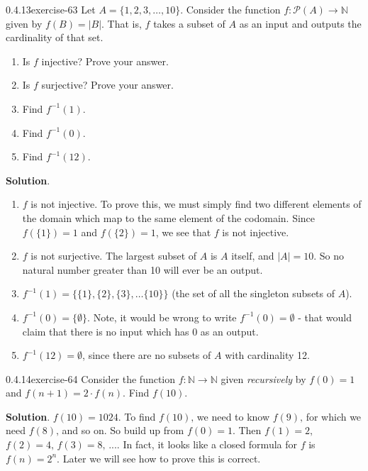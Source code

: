 \documentclass[twoside,11pt,]{book}
\numberwithin{equation}{chapter}
\newcommand{\N}{\mathbb N}
\newcommand{\pow}{\mathcal P}
\newcommand{\inv}{^{-1}}
\begin{document}
\begin{divisionsolution}{0.4.13}{}{exercise-63}%
\hypertarget{p-1070}{}%
Let \(A = \{1,2,3,\ldots,10\}\). Consider the function \(f:\pow(A) \to \N\) given by \(f(B) = |B|\). That is, \(f\) takes a subset of \(A\) as an input and outputs the cardinality of that set.\leavevmode%
\begin{enumerate}[label=(\alph*)]
\item\hypertarget{li-867}{}\hypertarget{p-1071}{}%
Is \(f\) injective? Prove your answer.%
\item\hypertarget{li-868}{}\hypertarget{p-1072}{}%
Is \(f\) surjective? Prove your answer.%
\item\hypertarget{li-869}{}\hypertarget{p-1073}{}%
Find \(f\inv(1)\).%
\item\hypertarget{li-870}{}\hypertarget{p-1074}{}%
Find \(f\inv(0)\).%
\item\hypertarget{li-871}{}\hypertarget{p-1075}{}%
Find \(f\inv(12)\).%
\end{enumerate}
%
\par\smallskip%
\noindent\textbf{Solution}.\quad%
\hypertarget{p-1076}{}%
\leavevmode%
\begin{enumerate}[label=(\alph*)]
\item\hypertarget{li-872}{}\hypertarget{p-1077}{}%
\(f\) is not injective. To prove this, we must simply find two different elements of the domain which map to the same element of the codomain. Since \(f(\{1\}) = 1\) and \(f(\{2\}) = 1\), we see that \(f\) is not injective.%
\item\hypertarget{li-873}{}\hypertarget{p-1078}{}%
\(f\) is not surjective. The largest subset of \(A\) is \(A\) itself, and \(|A| = 10\). So no natural number greater than 10 will ever be an output.%
\item\hypertarget{li-874}{}\hypertarget{p-1079}{}%
\(f\inv(1) = \{\{1\}, \{2\}, \{3\}, \ldots \{10\}\}\) (the set of all the singleton subsets of \(A\)).%
\item\hypertarget{li-875}{}\hypertarget{p-1080}{}%
\(f\inv(0) = \{\emptyset\}\). Note, it would be wrong to write \(f\inv(0) = \emptyset\) - that would claim that there is no input which has 0 as an output.%
\item\hypertarget{li-876}{}\hypertarget{p-1081}{}%
\(f\inv(12) = \emptyset\), since there are no subsets of \(A\) with cardinality 12.%
\end{enumerate}
%
\end{divisionsolution}%
\begin{divisionsolution}{0.4.14}{}{exercise-64}%
\hypertarget{p-1085}{}%
Consider the function \(f:\N \to \N\) given \emph{recursively} by \(f(0) = 1\) and \(f(n+1) = 2\cdot f(n)\text{.}\) Find \(f(10)\text{.}\)%
\par\smallskip%
\noindent\textbf{Solution}.\quad%
\hypertarget{p-1087}{}%
\(f(10) = 1024\text{.}\) To find \(f(10)\text{,}\) we need to know \(f(9)\text{,}\) for which we need \(f(8)\text{,}\) and so on. So build up from \(f(0) = 1\text{.}\) Then \(f(1) = 2\text{,}\) \(f(2) = 4\text{,}\) \(f(3) = 8\text{,}\) .... In fact, it looks like a closed formula for \(f\) is \(f(n) = 2^n\text{.}\) Later we will see how to prove this is correct.%
\end{divisionsolution}%
\end{document}
